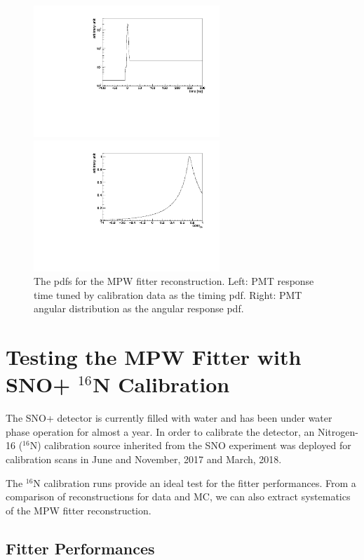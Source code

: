 \documentclass[preprint,12pt]{elsarticle}
\numberwithin{equation}{section}
\begin{document}
\begin{figure}[htbp]
	\centering
	\begin{minipage}[t]{0.48\textwidth}
		\centering
		\includegraphics[width=7cm]{MPW_timingPDF.pdf}
	\end{minipage}
	\begin{minipage}[t]{0.48\textwidth}
		\centering
		\includegraphics[width=7cm]{MPW_angularPDF.pdf}
	\end{minipage}
	\caption{The pdfs for the MPW fitter reconstruction. Left: PMT response time tuned by calibration data as the timing pdf. Right: PMT angular distribution as the angular response pdf.}
    \label{mpwpdf}
\end{figure}

\section{Testing the MPW Fitter with SNO+ $^{16}$N Calibration}
The SNO+ detector is currently filled with water and has been under water phase operation for almost a year. In order to calibrate the detector, an Nitrogen-16 ($^{16}$N) calibration source inherited from the SNO experiment was deployed for calibration scans in June and November, 2017 and March, 2018. 

The $^{16}$N calibration runs provide an ideal test for the fitter performances. From a comparison of reconstructions for data and MC, we can also extract systematics of the MPW fitter reconstruction. 

\subsection{Fitter Performances}
\end{document}
